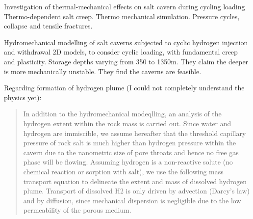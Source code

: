 \begin{frame}{\cite{li2021investigation} Investigation of thermal-mechanical effects on salt cavern during cycling loading}
Thermo-dependent salt creep. Thermo mechanical simulation. Pressure cycles, collapse and tensile fractures.
\end{frame}

\begin{frame}[shrink=30,fragile]{\cite{coarita23} Hydromechanical modelling of salt caverns subjected to cyclic hydrogen injection and withdrawal}
2D models, to consder cyclic loading, with fundamental creep and plasticity. Storage depths varying from 350 to 1350m. They claim the deeper is more mechanically unstable. They find the caverns are feasible.

Regarding formation of hydrogen plume (I could not completely understand the physics yet):
\begin{quote}
In addition to the hydromechanical modeqlling, an analysis of the
hydrogen extent within the rock mass is carried out. Since water and
hydrogen are immiscible, we assume hereafter that the threshold
capillary pressure of rock salt is much higher than hydrogen pressure
within the cavern due to the nanometric size of pore throats and hence
no free gas phase will be flowing. Assuming hydrogen is a non-reactive
solute (no chemical reaction or sorption with salt), we use the following
mass transport equation to delineate the extent and mass of dissolved
hydrogen plume. Transport of dissolved H2 is only driven by advection
(Darcy’s law) and by diffusion, since mechanical dispersion is negligible
due to the low permeability of the porous medium.
\end{quote}
\end{frame}

